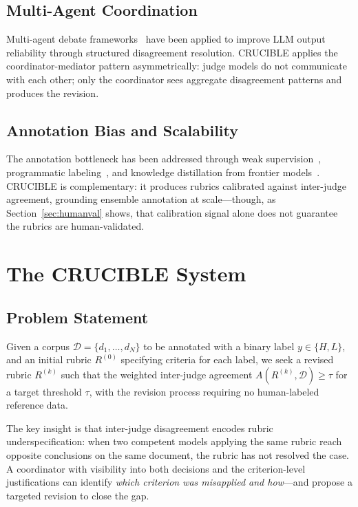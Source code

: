 \documentclass[11pt]{article}
\begin{document}
\subsection{Multi-Agent Coordination}

Multi-agent debate frameworks~\cite{du2023improving} have been applied to
improve LLM output reliability through structured disagreement resolution.
CRUCIBLE applies the coordinator-mediator pattern asymmetrically: judge models
do not communicate with each other; only the coordinator sees aggregate
disagreement patterns and produces the revision.

\subsection{Annotation Bias and Scalability}

The annotation bottleneck has been addressed through weak
supervision~\cite{ratner2017snorkel}, programmatic
labeling~\cite{bach2019snorkel}, and knowledge distillation from frontier
models~\cite{hinton2015distilling}. CRUCIBLE is complementary: it produces
rubrics calibrated against inter-judge agreement, grounding ensemble
annotation at scale---though, as Section~\ref{sec:humanval} shows, that
calibration signal alone does not guarantee the rubrics are human-validated.

\section{The CRUCIBLE System}

\subsection{Problem Statement}

Given a corpus $\mathcal{D} = \{d_1, \ldots, d_N\}$ to be annotated with a
binary label $y \in \{H, L\}$, and an initial rubric $R^{(0)}$ specifying
criteria for each label, we seek a revised rubric $R^{(k)}$ such that the
weighted inter-judge agreement $A(R^{(k)}, \mathcal{D}) \geq \tau$ for a
target threshold $\tau$, with the revision process requiring no human-labeled
reference data.

The key insight is that inter-judge disagreement encodes rubric
underspecification: when two competent models applying the same rubric reach
opposite conclusions on the same document, the rubric has not resolved the
case. A coordinator with visibility into both decisions and the criterion-level
justifications can identify \emph{which criterion was misapplied and
how}---and propose a targeted revision to close the gap.
\end{document}
